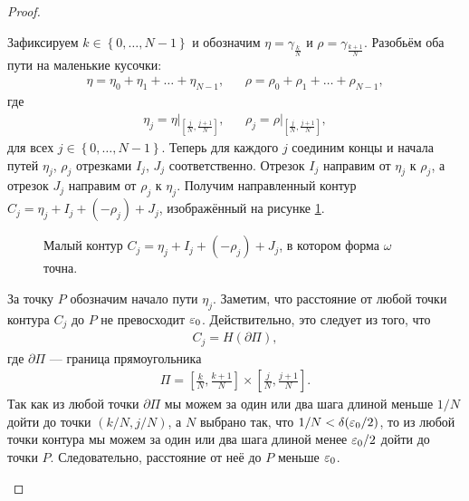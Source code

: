 \documentclass[../complex-analysis.tex]{subfiles}
\begin{document}
\begin{proof}
\begin{itemize}
   Зафиксируем $k \in \left\{ 0, \ldots, N-1 \right\}$ и обозначим $\eta = \gamma_{\frac{k}{N}}$  и $\rho = \gamma_{\frac{k+1}{N}}$. Разобьём оба пути на маленькие кусочки:
   \begin{align*}
    \eta = \eta_0 + \eta_1 + \ldots + \eta_{N-1}, & &\rho = \rho_0 + \rho_1 + \ldots + \rho_{N-1},
   \end{align*} где
   \begin{align*}
    \eta_j = \eta \rvert_{\left[\frac{j}{N},\frac{j+1}{N}\right]  }, & &\rho_j = \rho \rvert_{\left[\frac{j}{N},\frac{j+1}{N}\right]  },
   \end{align*} для всех $j \in \left\{ 0, \ldots, N - 1 \right\}$. Теперь для каждого $j$ соединим концы и начала путей $\eta_j$, $\rho_j$ отрезками $I_j$, $J_j$ соответственно. Отрезок $I_j$ направим от $\eta_j$ к $\rho_j$, а отрезок $J_j$ направим от $\rho_j$ к $\eta_j$. Получим направленный контур $C_j = \eta_j + I_j + (-\rho_j) + J_j$, изображённый на рисунке \ref{fig:closed_1_form_small_contur}.

   \begin{figure}[ht]
    \centering
    \caption{Малый контур $C_j = \eta_j + I_j + (-\rho_j) + J_j$, в котором форма $\omega$ точна.}
    \label{fig:closed_1_form_small_contur}
   \end{figure}

   За точку $P$ обозначим начало пути $\eta_j$. Заметим, что расстояние от любой точки контура $C_j$ до $P$ не превосходит $\varepsilon_0$. Действительно, это следует из того, что
   \begin{align*}
    C_j = H(\partial \Pi),
   \end{align*} где $\partial \Pi$ --- граница прямоугольника
   \begin{align*}
    \Pi = \left[ \frac{k}{N}, \frac{k+1}{N} \right] \times \left[ \frac{j}{N}, \frac{j+1}{N} \right].
   \end{align*} Так как из любой точки $\partial \Pi$ мы можем за один или два шага длиной меньше $1 / N$ дойти до точки $(k / N, j / N)$, а $N$ выбрано так, что $1 / N < \delta(\varepsilon_0 / 2)$, то из любой точки контура мы можем за один или два шага длиной менее $\varepsilon_0 / 2$ дойти до точки $P$. Следовательно, расстояние от неё до $P$ меньше $\varepsilon_0$.


\end{itemize}
\end{proof}
\end{document}
